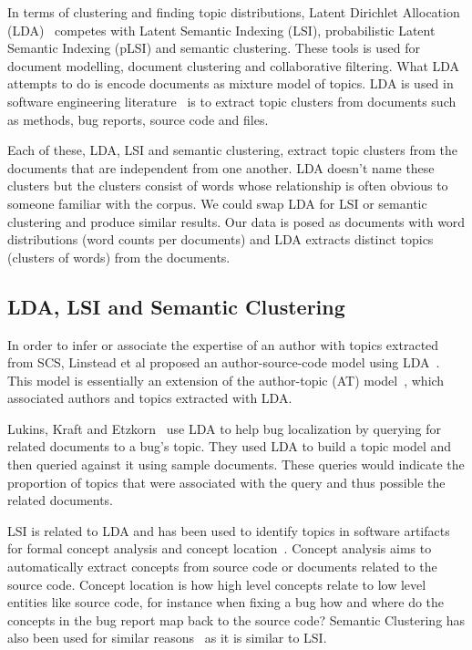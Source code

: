 \documentclass[times, 10pt,twocolumn]{article}
\begin{document}


In terms of clustering and finding topic distributions, Latent
Dirichlet Allocation (LDA)~\cite{944937} competes with Latent Semantic
Indexing (LSI), probabilistic Latent Semantic Indexing (pLSI) and
semantic clustering. These tools is used for document modelling,
document clustering and collaborative filtering. What LDA attempts to
do is encode documents as mixture model of topics.  LDA is used in
software engineering
literature~\cite{lukins2008,10.1109/MSR.2007.20,NIPS2007637,1321709}
is to extract topic clusters from documents such as methods, bug
reports, source code and files.

Each of these, LDA, LSI and semantic clustering, extract topic
clusters from the documents that are independent from one another. LDA
doesn't name these clusters but the clusters consist of words whose
relationship is often obvious to someone familiar with the corpus. We
could swap LDA for LSI or semantic clustering and produce similar
results. Our data is posed as documents with word distributions (word
counts per documents) and LDA extracts distinct topics (clusters of
words) from the documents.

\subsection{LDA, LSI and Semantic Clustering}

In order to infer or associate the expertise of an author with topics
extracted from SCS, Linstead et al proposed an author-source-code model
using LDA~\cite{10.1109/MSR.2007.20,NIPS2007637,1321709}. This model
is essentially an extension of the author-topic (AT)
model~\cite{1036902}, which associated authors and topics extracted
with LDA.

Lukins, Kraft and Etzkorn~\cite{lukins2008} use LDA to help bug
localization by querying for related documents to a bug's topic. They
used LDA to build a topic model and then queried against it using
sample documents. These queries would indicate the proportion of
topics that were associated with the query and thus possible the
related documents.

LSI is related to LDA and has been used to identify topics in software
artifacts for formal concept analysis and concept
location~\cite{1421013,1374321,10.1109/ICPC.2007.13,10.1109/ICPC.2006.17}.
Concept analysis aims to automatically extract concepts from source
code or documents related to the source code.  Concept location is how
high level concepts relate to low level entities like source code, for
instance when fixing a bug how and where do the concepts in the bug
report map back to the source code?  Semantic Clustering has also been
used for similar reasons~\cite{1698774,1566153} as it is similar to
LSI.
\end{document}
